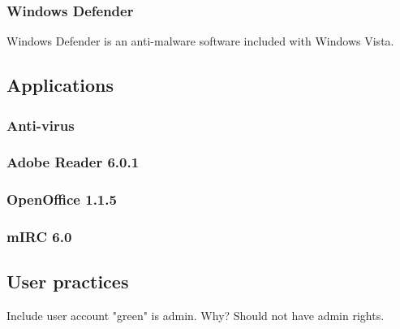 \subsubsection{Windows Defender}

Windows Defender is an anti-malware software included with Windows Vista. 

\subsection{Applications}

\subsubsection{Anti-virus}

\subsubsection{Adobe Reader 6.0.1}

\subsubsection{OpenOffice 1.1.5}

\subsubsection{mIRC 6.0}

\subsection{User practices}

Include user account "green" is admin. Why? Should not have admin rights.